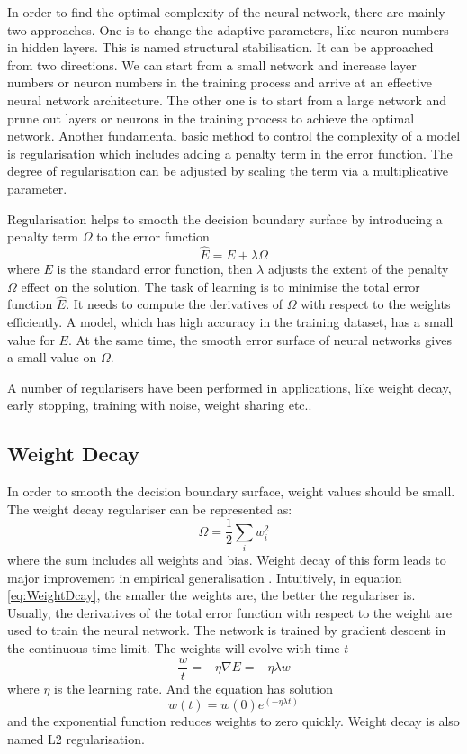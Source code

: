 In order to find the optimal complexity of the neural network, there are mainly two approaches. One is to change the adaptive parameters, like neuron numbers in hidden layers. This is named structural stabilisation. It can be approached from two directions. We can start from a small network and increase layer numbers or neuron numbers in the training process and arrive at an effective neural network architecture. The other one is to start from a large network and prune out layers or neurons in the training process to achieve the optimal network. Another fundamental basic method to control the complexity of a model is regularisation which includes adding a penalty term in the error function. The degree of regularisation can be adjusted by scaling the term via a multiplicative parameter.

Regularisation helps to smooth the decision boundary surface by introducing a penalty term $\Omega$ to the error function
\begin{equation}\label{eq:Regularization}
\hat{E} = E + \lambda\Omega
\end{equation}
where $E$ is the standard error function, then $\lambda$ adjusts the extent of the penalty $\Omega$ effect on the solution. The task of learning is to minimise the total error function $\hat{E}$. It needs to compute the derivatives of $\Omega$ with respect to the weights efficiently. A model, which has high accuracy in the training dataset, has a small value for $E$. At the same time, the smooth error surface of neural networks gives a small value on $\Omega$.

A number of regularisers have been performed in applications, like weight decay, early stopping, training with noise, weight sharing etc..

\subsection{Weight Decay}

In order to smooth the decision boundary surface, weight values should be small. The weight decay regulariser can be represented as:
\begin{equation}\label{eq:WeightDcay}
\Omega = \frac{1}{2} \sum_i w_{i}^2
\end{equation}
where the sum includes all weights and bias. Weight decay of this form leads to major improvement in empirical generalisation \citep{hinton1987learning}. Intuitively, in equation \ref{eq:WeightDcay}, the smaller the weights are, the better the regulariser is. Usually, the derivatives of the total error function with respect to the weight are used to train the neural network. The network is trained by gradient descent in the continuous time limit. The weights will evolve with time $t$
\begin{equation}\label{eq:WeightDecayTime}
\frac{w}{t} = -\eta\nabla E = -\eta\lambda w
\end{equation}
where $\eta$ is the learning rate. And the equation has solution
\begin{equation}\label{eq:WeightDecaySolution}
w(t) = w(0)e^{(-\eta\lambda t)}
\end{equation}
and the exponential function reduces weights to zero quickly. Weight decay is also named L2 regularisation.

